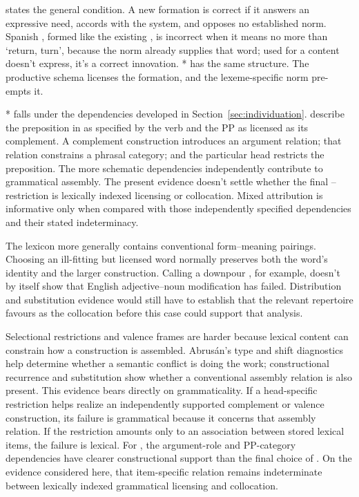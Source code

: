 \documentclass[12pt,letterpaper]{article}
\begin{document}
\textcite[94]{coseriu2019} states the general condition. A new formation is
correct if it answers an expressive need, accords with the system, and opposes no
established norm. Spanish , formed like the existing
, is incorrect when it means no more than
 `return, turn', because the norm already supplies that word; used
for a content  doesn't express, it's a correct innovation. *
has the same structure. The productive schema licenses the formation, and the
lexeme-specific norm pre-empts it.

* falls under the dependencies developed in
Section~\ref{sec:individuation}. \textcite[220]{huddleston2002} describe the
preposition in  as specified by the verb and the PP as
licensed as its complement. A complement construction introduces an argument
relation; that relation constrains a phrasal category; and the particular head
restricts the preposition. The more schematic dependencies independently
contribute to grammatical assembly. The present evidence doesn't settle whether the final
-- restriction is lexically indexed licensing or
collocation. Mixed attribution is informative only when compared with those
independently specified dependencies and their stated indeterminacy.

The lexicon more generally contains conventional form--meaning pairings. Choosing
an ill-fitting but licensed word normally preserves both the word's identity and
the larger construction. Calling a downpour , for example,
doesn't by itself show that English adjective--noun modification has failed.
Distribution and substitution evidence would still have to establish that the
relevant repertoire favours  as the collocation before this
case could support that analysis.

Selectional restrictions and valence frames are harder because lexical content
can constrain how a construction is assembled. Abrus\'an's type and shift
diagnostics help determine whether a semantic conflict is doing the work;
constructional recurrence and substitution show whether a conventional assembly
relation is also present. This evidence bears directly on grammaticality. If a
head-specific restriction helps realize an independently supported complement or
valence construction, its failure is grammatical because it concerns that
assembly relation. If
the restriction amounts only to an association between stored lexical items, the
failure is lexical. For , the argument-role and PP-category
dependencies have clearer constructional support than the final choice of
. On the evidence considered here, that item-specific relation remains
indeterminate between lexically indexed grammatical licensing and collocation.
\end{document}
